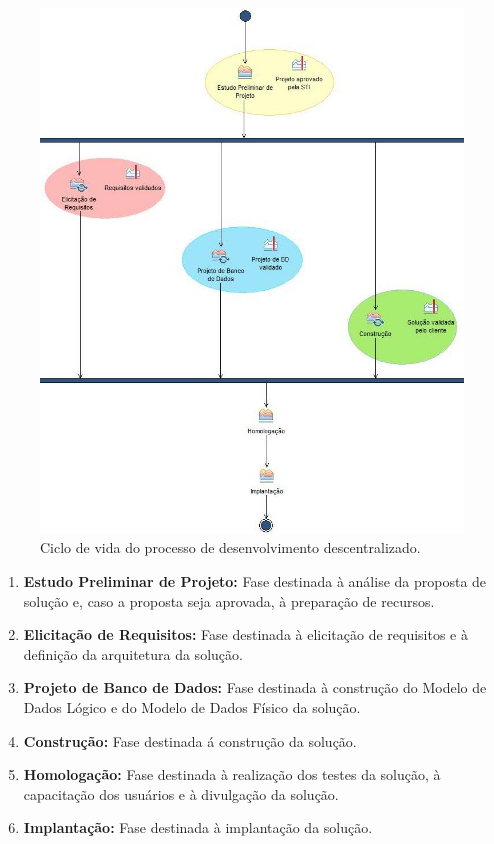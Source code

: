\begin{figure}[h]
	\centering
		\includegraphics[scale=0.8]{figuras/PDESC}
	\caption{Ciclo de vida do processo de desenvolvimento descentralizado.}
\end{figure}

\begin{enumerate}
	\item \textbf{Estudo Preliminar de Projeto:} Fase destinada à análise da proposta de solução e, caso a proposta seja aprovada, à preparação de recursos.
	\item \textbf{Elicitação de Requisitos:} Fase destinada à elicitação de requisitos e à definição da arquitetura da solução.
	\item \textbf{Projeto de Banco de Dados:} Fase destinada à construção do Modelo de Dados Lógico e do Modelo de Dados Físico da solução.
	\item \textbf{Construção:} Fase destinada á construção da solução.
	\item \textbf{Homologação:} Fase destinada à realização dos testes da solução, à capacitação dos usuários e à divulgação da solução.
	\item \textbf{Implantação:} Fase destinada à implantação da solução.
\end{enumerate}
\clearpage

